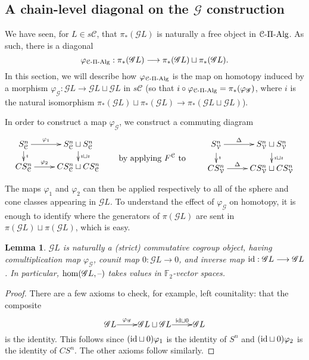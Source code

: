 \documentclass[11pt]{amsart}
\theoremstyle{plain}
\newtheorem{lem}[thm]{Lemma}
\theoremstyle{definition}
\newcommand{\DASH}{\textup{--}}
\let\phi\varphi
\renewcommand{\to}{\longrightarrow}
\newcommand{\scrG}{\mathscr{G}}
\newcommand{\calV}{\mathcal{V}}
\newcommand{\calc}{\mathcal{C}}
\theoremstyle{plain}
\newcommand{\vect}[2]{\calV^{#1}_{#2}}
\newcommand{\BSW}{{\scrG}}
\newcommand{\PiAlg}{\textup{-$\Pi$-Alg}}
\newcommand{\F}{\mathbb{F}}
\newcommand{\Id}{\textup{id}}
\newcommand{\Ftwo}{\F_2}
\begin{document}
\begin{Composite functor spectral sequences}
\subsection{A chain-level diagonal on the $\BSW $ construction}
\label{Subsection: Chain level diagonal}
We have seen, for $L\in s\calc$, that $\pi_*(\BSW L)$ is naturally a free object in $\calc\PiAlg$. As such, there is a diagonal
\[\phi_{\calc\PiAlg}:\pi_*(\BSW L)\to \pi_*(\BSW L)\sqcup \pi_*(\BSW L).\]
In this section, we will describe how $\phi_{\calc\PiAlg}$ is the map on homotopy induced by a morphism $\phi_\BSW :\BSW L\to \BSW L\sqcup \BSW L$ in $s\calc$ (so that $i\circ\phi_{\calc\PiAlg}=\pi_*(\phi_{\BSW})$, where $i$ is the natural isomorphism $\pi_*(\BSW L)\sqcup\pi_*(\BSW L)\to \pi_*(\BSW L\sqcup \BSW L)$).

In order to construct a map $\phi_\BSW $, we construct a commuting diagram
\[\xymatrix@R=4mm{
S^n_{\calc}\ar[r]^-{\phi_1}
\ar[d]^-{\imath}
&%
S^n_{\calc}\sqcup S^n_{\calc}\ar[d]^-{\imath\sqcup\imath}
\\%
CS^n_{\calc}\ar[r]^-{\phi_2}
&%
CS^n_{\calc}\sqcup CS^n_{\calc}%
}\qquad \textup{\raisebox{-6mm}{by applying $F^\calc$ to }}\qquad \xymatrix@R=4mm{
S^n_{\vect{}{}}\ar[r]^-{\Delta}
\ar[d]^-{\imath}
&%
S^n_{\vect{}{}}\sqcup S^n_{\vect{}{}}\ar[d]^-{\imath\sqcup\imath}
\\%
CS^n_{\vect{}{}}\ar[r]^-{\Delta}
&%
CS^n_{\vect{}{}}\sqcup CS^n_{\vect{}{}}%
}\]
The maps $\phi_1$ and $\phi_2$ can then be applied respectively to all of the sphere and cone classes appearing in $\BSW L$.
To understand the effect of $\phi_{\BSW }$ on homotopy, it is enough to identify where the generators of $\pi(\BSW L)$ are sent in $\pi(\BSW L)\sqcup\pi(\BSW L)$, which is easy.
\begin{lem}
$\BSW L$ is naturally a (strict) commutative cogroup object, having comultiplication map $\phi_{\BSW }$, counit map $0:\BSW L\to 0$, and inverse map $\Id:\BSW L\to \BSW L$. In particular, $\hom(\BSW L,\DASH)$ takes values in $\ensuremath{\Ftwo }$-vector spaces.
\end{lem}
\begin{proof}
There are a few axioms to check, for example, left counitality: that the composite 
\[\xymatrix@R=4mm@1{
\BSW L\ar[r]^-{\phi_{\BSW }}
&%
\BSW L\sqcup \BSW L\ar[r]^-{\Id\sqcup0}
&%
\BSW L%
}\] is the identity. This follows since $(\Id\sqcup0)\phi_1$ is the identity of $S^n$ and $(\Id\sqcup0)\phi_2$ is the identity of $CS^n$. The other axioms follow similarly.
\end{proof}


\end{Composite functor spectral sequences}
\end{document}
